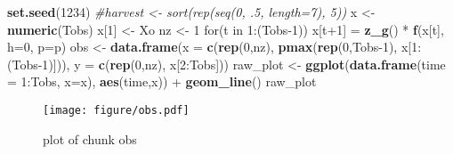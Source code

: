 \documentclass[author-year, review]{elsarticle} %
\makeatletter
\newenvironment{Shaded}{}{}
\newcommand{\KeywordTok}[1]{\textcolor[rgb]{0.00,0.44,0.13}{\textbf{{#1}}}}
\newcommand{\DataTypeTok}[1]{\textcolor[rgb]{0.56,0.13,0.00}{{#1}}}
\newcommand{\DecValTok}[1]{\textcolor[rgb]{0.25,0.63,0.44}{{#1}}}
\newcommand{\CommentTok}[1]{\textcolor[rgb]{0.38,0.63,0.69}{\textit{{#1}}}}
\newcommand{\NormalTok}[1]{{#1}}
\def\maxwidth{\ifdim\Gin@nat@width>\linewidth\linewidth
\else\Gin@nat@width\fi}
\let\Oldincludegraphics\includegraphics
\renewcommand{\includegraphics}[1]{\Oldincludegraphics[width=\maxwidth]{#1}}
\makeatother
\begin{document}
\begin{Shaded}
\begin{Highlighting}[]
  \KeywordTok{set.seed}\NormalTok{(}\DecValTok{1234}\NormalTok{)}
  \CommentTok{#harvest <- sort(rep(seq(0, .5, length=7), 5))}
  \NormalTok{x <- }\KeywordTok{numeric}\NormalTok{(Tobs)}
  \NormalTok{x[}\DecValTok{1}\NormalTok{] <- Xo}
  \NormalTok{nz <- }\DecValTok{1}
  \NormalTok{for(t in }\DecValTok{1}\NormalTok{:(Tobs}\DecValTok{-1}\NormalTok{))}
    \NormalTok{x[t}\DecValTok{+1}\NormalTok{] = }\KeywordTok{z_g}\NormalTok{() * }\KeywordTok{f}\NormalTok{(x[t], }\DataTypeTok{h=}\DecValTok{0}\NormalTok{, }\DataTypeTok{p=}\NormalTok{p)}
  \NormalTok{obs <- }\KeywordTok{data.frame}\NormalTok{(}\DataTypeTok{x =} \KeywordTok{c}\NormalTok{(}\KeywordTok{rep}\NormalTok{(}\DecValTok{0}\NormalTok{,nz), }
                          \KeywordTok{pmax}\NormalTok{(}\KeywordTok{rep}\NormalTok{(}\DecValTok{0}\NormalTok{,Tobs}\DecValTok{-1}\NormalTok{), x[}\DecValTok{1}\NormalTok{:(Tobs}\DecValTok{-1}\NormalTok{)])), }
                    \DataTypeTok{y =} \KeywordTok{c}\NormalTok{(}\KeywordTok{rep}\NormalTok{(}\DecValTok{0}\NormalTok{,nz), }
                          \NormalTok{x[}\DecValTok{2}\NormalTok{:Tobs]))}
\NormalTok{raw_plot <- }\KeywordTok{ggplot}\NormalTok{(}\KeywordTok{data.frame}\NormalTok{(}\DataTypeTok{time =} \DecValTok{1}\NormalTok{:Tobs, }\DataTypeTok{x=}\NormalTok{x), }\KeywordTok{aes}\NormalTok{(time,x)) + }\KeywordTok{geom_line}\NormalTok{()}
\NormalTok{raw_plot}
\end{Highlighting}
\end{Shaded}

\begin{figure}[htbp]
\centering
\texttt{[image: figure/obs.pdf]}
\caption{plot of chunk obs}
\end{figure}
\end{document}
